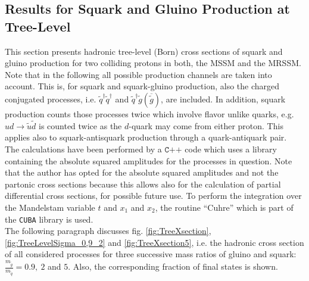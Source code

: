 \subsection{Results for Squark and Gluino Production at Tree-Level}\label{sec:tree-level_cross_sections}
This section presents hadronic tree-level (Born) cross sections of squark and gluino production for two colliding protons in both, the MSSM and the MRSSM.\\
Note that in the following all possible production channels are taken into account. This is, for squark and squark-gluino production, also the charged conjugated processes, i.e. $\tilde{q}^\dagger\tilde{q}^\dagger$ and $\tilde{q}^\dagger\tilde{g}\left( \overline{\tilde{g}} \right)$, are included. In addition, squark production counts those processes twice which involve flavor unlike quarks, e.g. $ud \to \tilde{u}\tilde{d}$ is counted twice as the $d$-quark may come from either proton. This applies also to squark-antisquark production through a quark-antiquark pair.\\
The calculations have been performed by a $\texttt{C++}$ code which uses a library containing the absolute squared amplitudes for the processes in question. Note that the author has opted for the absolute squared amplitudes and not the partonic cross sections because this allows also for the calculation of partial differential cross sections, for possible future use. To perform the integration over the Mandelstam variable $t$ and $x_1$ and $x_2$, the routine ``Cuhre'' which is part of the \texttt{CUBA} library\cite{Hahn:2004fe} is used.\\
The following paragraph discusses fig. \ref{fig:TreeXsection}, \ref{fig:TreeLevelSigma_0,9_2} and \ref{fig:TreeXsection5}, i.e. the hadronic cross section of all considered processes for three successive mass ratios of gluino and squark: $\frac{m_{\tilde{g}}}{m_{\tilde{q}}} = 0.9,\ 2$ and $5$. Also, the corresponding fraction of final states is shown.
